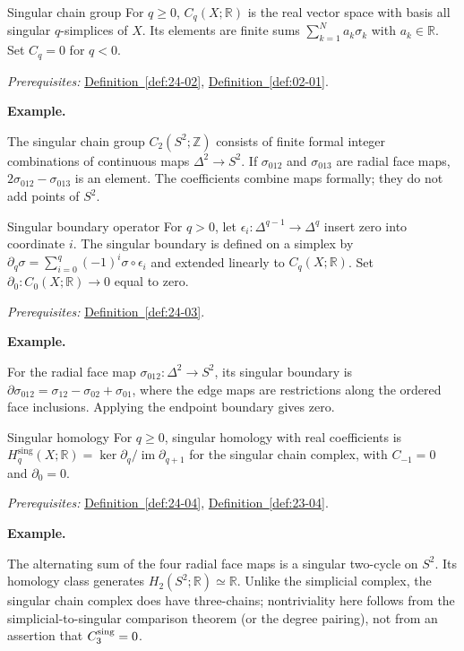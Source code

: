 \documentclass[11pt]{article}
\makeatletter
\newcommand{\R}{\mathbb R}
\newcounter{definition}
\newcommand{\Z}{\mathbb Z}
\newcommand{\exampleheading}{\par\medskip\textbf{Example.}\par\smallskip}
\newcommand{\currentdefinition}[1]{\protected@edef\@currentlabel{#1}}
\makeatother
\begin{document}
\begin{definitionbox}{Singular chain group}
\currentdefinition{\thedefinition}
\label{def:24-03}
For $q\ge0$, $C_q(X;\R)$ is the real vector space with basis all singular $q$-simplices of $X$. Its elements are finite sums $\sum_{k=1}^N a_k\sigma_k$ with $a_k\in\R$. Set $C_q=0$ for $q<0$.

\smallskip
\textit{Prerequisites:} \hyperref[def:24-02]{Definition~\ref*{def:24-02}}, \hyperref[def:02-01]{Definition~\ref*{def:02-01}}.

\exampleheading
The singular chain group $C_2(S^2;\Z)$ consists of finite formal integer combinations of continuous maps $\Delta^2\to S^2$. If $\sigma_{012}$ and $\sigma_{013}$ are radial face maps, $2\sigma_{012}-\sigma_{013}$ is an element. The coefficients combine maps formally; they do not add points of $S^2$.
\end{definitionbox}

\begin{definitionbox}{Singular boundary operator}
\currentdefinition{\thedefinition}
\label{def:24-04}
For $q>0$, let $\epsilon_i:\Delta^{q-1}\to\Delta^q$ insert zero into coordinate $i$. The singular boundary is defined on a simplex by $\partial_q\sigma=\sum_{i=0}^q(-1)^i\sigma\circ\epsilon_i$ and extended linearly to $C_q(X;\R)$. Set $\partial_0:C_0(X;\R)\to0$ equal to zero.

\smallskip
\textit{Prerequisites:} \hyperref[def:24-03]{Definition~\ref*{def:24-03}}.

\exampleheading
For the radial face map $\sigma_{012}:\Delta^2\to S^2$, its singular boundary is $\partial\sigma_{012}=\sigma_{12}-\sigma_{02}+\sigma_{01}$, where the edge maps are restrictions along the ordered face inclusions. Applying the endpoint boundary gives zero.
\end{definitionbox}

\begin{definitionbox}{Singular homology}
\currentdefinition{\thedefinition}
\label{def:24-05}
For $q\ge0$, singular homology with real coefficients is $H_q^{\mathrm{sing}}(X;\R)=\ker\partial_q/\operatorname{im}\partial_{q+1}$ for the singular chain complex, with $C_{-1}=0$ and $\partial_0=0$.

\smallskip
\textit{Prerequisites:} \hyperref[def:24-04]{Definition~\ref*{def:24-04}}, \hyperref[def:23-04]{Definition~\ref*{def:23-04}}.

\exampleheading
The alternating sum of the four radial face maps is a singular two-cycle on $S^2$. Its homology class generates $H_2(S^2;\R)\simeq\R$. Unlike the simplicial complex, the singular chain complex does have three-chains; nontriviality here follows from the simplicial-to-singular comparison theorem (or the degree pairing), not from an assertion that $C_3^{\rm sing}=0$.
\end{definitionbox}
\end{document}
